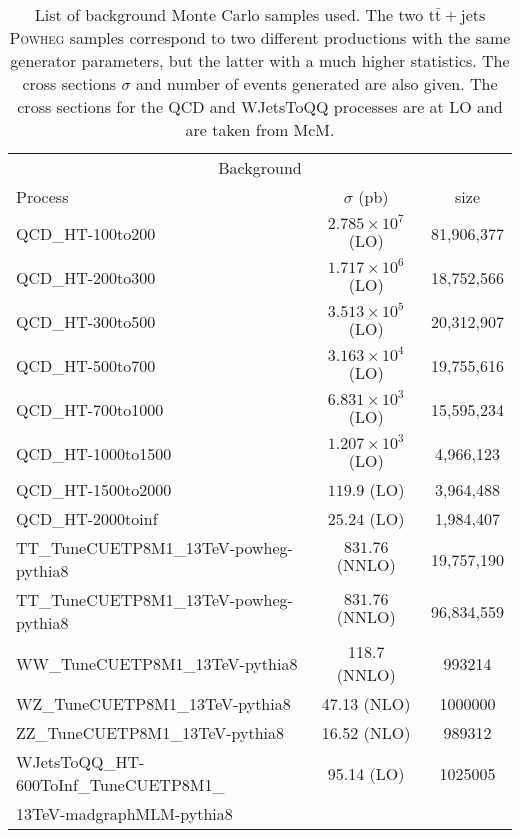 \begin{table}[htb]
  \begin{center}
    \begin{tabular}{l|c|c}
      \hline
      \hline
      \multicolumn{3}{c}{Background} \\ \cline{1-3}
      Process & $\sigma$ (pb) & size \\
      \hline
      {QCD\_HT-100to200}   & $2.785\times 10^7 $ (LO) & 81,906,377 \\
      {QCD\_HT-200to300}   & $1.717\times 10^6 $ (LO) & 18,752,566 \\
      {QCD\_HT-300to500}   & $3.513\times 10^5 $ (LO) & 20,312,907 \\
      {QCD\_HT-500to700}   & $3.163\times 10^4 $ (LO) & 19,755,616 \\
      {QCD\_HT-700to1000}  & $6.831\times 10^3$  (LO) & 15,595,234 \\
      {QCD\_HT-1000to1500} & $1.207\times 10^3$  (LO) & 4,966,123  \\
      {QCD\_HT-1500to2000} & $119.9 $            (LO) & 3,964,488  \\
      {QCD\_HT-2000toinf}  & $25.24 $            (LO) & 1,984,407  \\
      \hline
      {TT\_TuneCUETP8M1\_13TeV-powheg-pythia8} & $831.76$ (NNLO) & 19,757,190 \\
      {TT\_TuneCUETP8M1\_13TeV-powheg-pythia8} & $831.76$ (NNLO) & 96,834,559 \\
      \hline
      WW\_TuneCUETP8M1\_13TeV-pythia8 & 118.7 (NNLO) & 993214 \\
      \hline
      WZ\_TuneCUETP8M1\_13TeV-pythia8 & 47.13 (NLO) & 1000000 \\
      \hline
      ZZ\_TuneCUETP8M1\_13TeV-pythia8 &  16.52 (NLO) & 989312 \\
      \hline
      WJetsToQQ\_HT-600ToInf\_TuneCUETP8M1\_ & 95.14 (LO) & 1025005 \\
      13TeV-madgraphMLM-pythia8 & & \\
      \hline
      \hline
    \end{tabular}
  \caption{List of background Monte Carlo samples used. The two $\mathrm{t\bar{t}} + \mathrm{jets}$ \textsc{Powheg} samples correspond to two different productions with the same generator parameters, but the latter with a much higher statistics. The cross sections $\sigma$ and number of events generated are also given. The cross sections for the QCD and WJetsToQQ processes are at LO and are taken from McM. \label{tab:bkg_MC}}
  \end{center}
\end{table}

